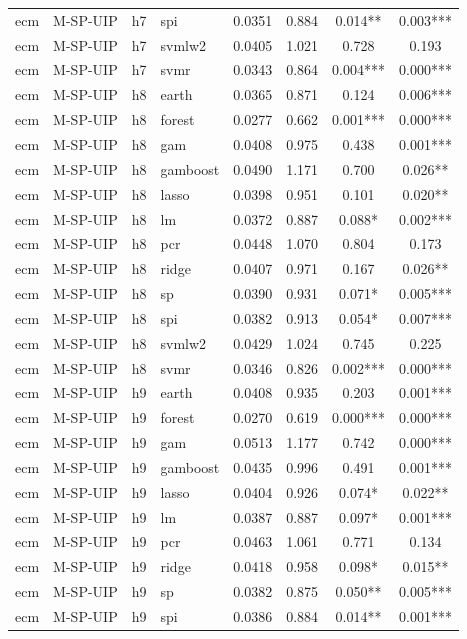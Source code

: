 \begin{ThreePartTable}
\begin{longtable}[t]{llclcccc}
ecm & M-SP-UIP & h7 & spi & 0.0351 & 0.884 & 0.014** & 0.003***\\
ecm & M-SP-UIP & h7 & svmlw2 & 0.0405 & 1.021 & 0.728 & 0.193\\
ecm & M-SP-UIP & h7 & svmr & 0.0343 & 0.864 & 0.004*** & 0.000***\\
\addlinespace
ecm & M-SP-UIP & h8 & earth & 0.0365 & 0.871 & 0.124 & 0.006***\\
ecm & M-SP-UIP & h8 & forest & 0.0277 & 0.662 & 0.001*** & 0.000***\\
ecm & M-SP-UIP & h8 & gam & 0.0408 & 0.975 & 0.438 & 0.001***\\
ecm & M-SP-UIP & h8 & gamboost & 0.0490 & 1.171 & 0.700 & 0.026**\\
ecm & M-SP-UIP & h8 & lasso & 0.0398 & 0.951 & 0.101 & 0.020**\\
ecm & M-SP-UIP & h8 & lm & 0.0372 & 0.887 & 0.088* & 0.002***\\
ecm & M-SP-UIP & h8 & pcr & 0.0448 & 1.070 & 0.804 & 0.173\\
ecm & M-SP-UIP & h8 & ridge & 0.0407 & 0.971 & 0.167 & 0.026**\\
ecm & M-SP-UIP & h8 & sp & 0.0390 & 0.931 & 0.071* & 0.005***\\
ecm & M-SP-UIP & h8 & spi & 0.0382 & 0.913 & 0.054* & 0.007***\\
ecm & M-SP-UIP & h8 & svmlw2 & 0.0429 & 1.024 & 0.745 & 0.225\\
ecm & M-SP-UIP & h8 & svmr & 0.0346 & 0.826 & 0.002*** & 0.000***\\
\addlinespace
ecm & M-SP-UIP & h9 & earth & 0.0408 & 0.935 & 0.203 & 0.001***\\
ecm & M-SP-UIP & h9 & forest & 0.0270 & 0.619 & 0.000*** & 0.000***\\
ecm & M-SP-UIP & h9 & gam & 0.0513 & 1.177 & 0.742 & 0.000***\\
ecm & M-SP-UIP & h9 & gamboost & 0.0435 & 0.996 & 0.491 & 0.001***\\
ecm & M-SP-UIP & h9 & lasso & 0.0404 & 0.926 & 0.074* & 0.022**\\
ecm & M-SP-UIP & h9 & lm & 0.0387 & 0.887 & 0.097* & 0.001***\\
ecm & M-SP-UIP & h9 & pcr & 0.0463 & 1.061 & 0.771 & 0.134\\
ecm & M-SP-UIP & h9 & ridge & 0.0418 & 0.958 & 0.098* & 0.015**\\
ecm & M-SP-UIP & h9 & sp & 0.0382 & 0.875 & 0.050** & 0.005***\\
ecm & M-SP-UIP & h9 & spi & 0.0386 & 0.884 & 0.014** & 0.001***\\

\end{longtable}
\end{ThreePartTable}
